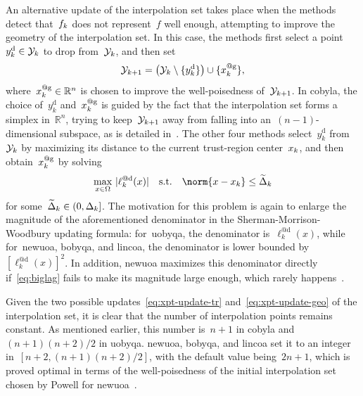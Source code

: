 \documentclass{article}
\numberwithin{equation}{section}
\theoremstyle{definition}
\theoremstyle{plain}
\theoremstyle{remark}
\newcommand*{\R}{\mathbb{R}}
\newcommand*{\abs}[2][]{#1\lvert#2#1\rvert}
\newcommand*{\set}[2][]{#1\{#2#1\}}
\newcommand{\drop}{{\text{d}}}
\newcommand{\geo}{{\text{g}}}
\newcommand{\st}{\text{s.t.}}
\newcommand{\fset}{\Omega}
\newcommand{\iter}[1][k]{x\ifthenelse{\equal{#1}{}}{}{_{#1}}}
\newcommand{\objm}[1][k]{\obj\ifthenelse{\equal{#1}{}}{}{_{#1}}}
\newcommand{\obj}{f}
\newcommand{\radalt}[1][k]{\widetilde{\Delta}\ifthenelse{\equal{#1}{}}{}{_{#1}}}
\newcommand{\rad}[1][k]{\Delta\ifthenelse{\equal{#1}{}}{}{_{#1}}}
\newcommand{\xpt}[1][k]{\mathcal{Y}\ifthenelse{\equal{#1}{}}{}{_{#1}}}
\begin{document}
An alternative update of the interpolation set takes place when the methods detect that~$\objm$ does not represent~$\obj$ well enough, attempting to improve the geometry of the interpolation set.
In this case, the methods first select a point~$y_k^{\drop} \in \xpt$ to drop from~$\xpt$, and then set
\begin{equation}
    \label{eq:xpt-update-geo}
    \xpt[k + 1] = \big(\xpt \setminus \set{y_k^{\drop}}\big) \cup \set{\iter^{@\geo}},
\end{equation}
where~$\iter^{@\geo} \in \R^n$ is chosen to improve the well-poisedness of~$\xpt[k + 1]$.
In \gls{cobyla}, the choice of~$y_k^{\drop}$ and~$\iter^{@\geo}$ is guided by the fact that the interpolation set forms a simplex in~$\R^n$, trying to keep~$\xpt[k+1]$ away from falling into an~$(n-1)$-dimensional subspace, as is detailed in~\cite[Equations~(15)--(17)]{Powell_1994}.
The other four methods select~$y_k^{\drop}$ from~$\xpt$ by maximizing its distance to the current trust-region center~$\iter$, and then obtain~$\iter^{@\geo}$ by solving
\begin{equation}
    \label{eq:biglag}
        \max_{x \in \fset} ~ \abs{\ell_k^{@\drop}(x)} \quad \st \quad \norm{x - \iter} \le \radalt
\end{equation}
for some~$\radalt \in (0, \rad]$.
The motivation for this problem is again to enlarge the magnitude of the aforementioned denominator in the Sherman-Morrison-Woodbury updating formula: for~\gls{uobyqa}, the denominator is~$\ell_k^{@\drop}(x)$, while for~\gls{newuoa}, \gls{bobyqa}, and \gls{lincoa}, the denominator is lower bounded by~$[\ell_k^{@\drop}(x)]^2$.
In addition, \gls{newuoa} maximizes this denominator directly if~\eqref{eq:biglag} fails to make its magnitude large enough, which rarely happens~\cite[\S~6]{Powell_2006}.

Given the two possible updates~\eqref{eq:xpt-update-tr} and~\eqref{eq:xpt-update-geo} of the interpolation set, it is clear that the number of interpolation points remains constant.
As mentioned earlier, this number is~$n+1$ in \gls{cobyla} and~$(n+1)(n+2)/2$ in \gls{uobyqa}.
\Gls{newuoa}, \gls{bobyqa}, and \gls{lincoa} set it to an integer in~$[n+2, (n+1)(n+2)/2]$, with the default value being~$2n+1$, which is proved optimal in terms of the well-poisedness of the initial interpolation set chosen by Powell for \gls{newuoa}~\cite{Ragonneau_Zhang_2023a}.

\subsection{}
\label{ssec:cobyla}
\end{document}
